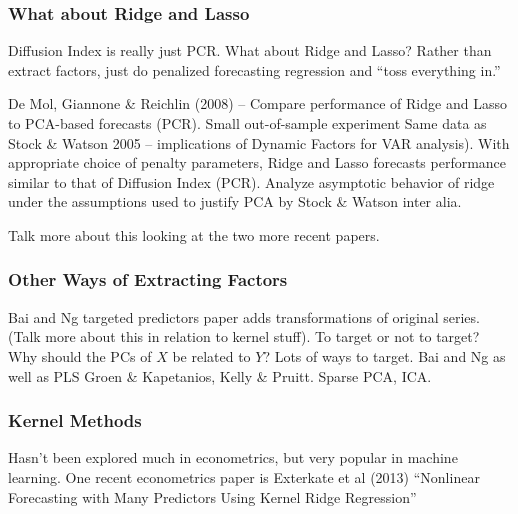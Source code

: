 \documentclass[handout]{beamer}
\begin{document}
\begin{frame}[c]\frametitle{What about Ridge and Lasso}
    
Diffusion Index is really just PCR. What about Ridge and Lasso? Rather than extract factors, just do penalized forecasting regression and ``toss everything in.''

De Mol, Giannone \& Reichlin (2008) -- Compare performance of Ridge and Lasso to PCA-based forecasts (PCR). Small out-of-sample experiment Same data as Stock \& Watson 2005 -- implications of Dynamic Factors for VAR analysis). With appropriate choice of penalty parameters, Ridge and Lasso forecasts performance similar to that of Diffusion Index (PCR). Analyze asymptotic behavior of ridge under the assumptions used to justify PCA by Stock \& Watson inter alia. 

Talk more about this looking at the two more recent papers.

\end{frame}
\begin{frame}[c]\frametitle{Other Ways of Extracting Factors}
    
Bai and Ng targeted predictors paper adds transformations of original series. (Talk more about this in relation to kernel stuff). To target or not to target? Why should the PCs of $X$ be related to $Y$? Lots of ways to target. Bai and Ng as well as PLS Groen \& Kapetanios, Kelly \& Pruitt. Sparse PCA, ICA.

\end{frame}
\begin{frame}[c]\frametitle{Kernel Methods}
   
   Hasn't been explored much in econometrics, but very popular in machine learning. One recent econometrics paper is Exterkate et al (2013) ``Nonlinear Forecasting with Many Predictors Using Kernel Ridge Regression''


\end{frame}
\end{document}
